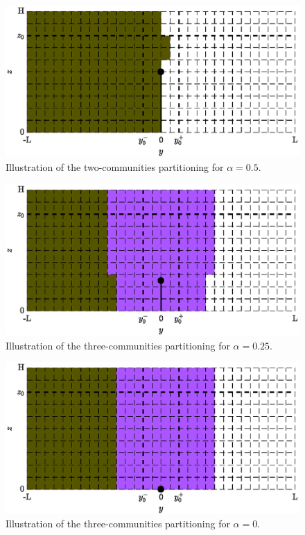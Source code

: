 \begin{figure}[!htp]
	\centering
	\includegraphics[width = .7\textwidth]{fig/problem2box/cluster_a5_2_.eps}
	\caption{Illustration of the two-communities partitioning for $\alpha = 0.5$.}
	\label{fig:cluster_a5_2}
\end{figure}

\begin{figure}[!htp]
	\centering
	\includegraphics[width = .7\textwidth]{fig/problem2box/cluster_a25_3_.eps}
	\caption{Illustration of the three-communities partitioning for $\alpha = 0.25$.}
	\label{fig:cluster_a25_3}
\end{figure}

\begin{figure}[!htp]
	\centering
	\includegraphics[width = .7\textwidth]{fig/problem2box/cluster_a0_3_.eps}
	\caption{Illustration of the three-communities partitioning for $\alpha = 0$.}
	\label{fig:cluster_a0_3}
\end{figure}

\newpage
